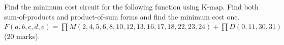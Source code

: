 % 

\begin{prob}
  Find the minimum cost circuit for the following function using K-map. Find both
  sum-of-products and product-of-sum forms and find the minimum cost one.\\
  $ F(a, b, c, d, e) = \prod M(2, 4, 5, 6, 8, 10, 12, 13, 16, 17, 18, 22, 23, 24)
   + \prod
  D(0, 11, 30, 31)$ (20 marks).
\end{prob}
\newpage
